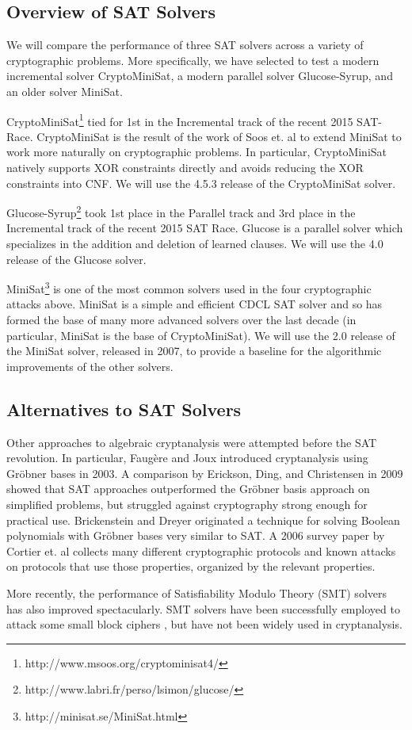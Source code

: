 \subsection{Overview of SAT Solvers}
\label{sec:related:solvers}

We will compare the performance of three SAT solvers across a variety of cryptographic problems. More specifically, we have selected to test a modern incremental solver CryptoMiniSat, a modern parallel solver Glucose-Syrup, and an older solver MiniSat.

CryptoMiniSat\footnote{http://www.msoos.org/cryptominisat4/} tied for 1st in the Incremental track of the recent 2015 SAT-Race. CryptoMiniSat is the result of the work of Soos et. al \cite{SNC09} to extend MiniSat to work more naturally on cryptographic problems.  In particular, CryptoMiniSat natively supports XOR constraints directly and avoids reducing the XOR constraints into CNF. We will use the 4.5.3 release of the CryptoMiniSat solver.

Glucose-Syrup\footnote{http://www.labri.fr/perso/lsimon/glucose/} took 1st place in the Parallel track and 3rd place in the Incremental track of the recent 2015 SAT Race. Glucose is a parallel solver which specializes in the addition and deletion of learned clauses. We will use the 4.0 release of the Glucose solver.

MiniSat\footnote{http://minisat.se/MiniSat.html} is one of the most common solvers used in the four cryptographic attacks above. MiniSat is a simple and efficient CDCL SAT solver and so has formed the base of many more advanced solvers over the last decade (in particular, MiniSat is the base of CryptoMiniSat). We will use the 2.0 release of the MiniSat solver, released in 2007, to provide a baseline for the algorithmic improvements of the other solvers.

\subsection{Alternatives to SAT Solvers}
\label{sec:related:otherattacks}
Other approaches to algebraic cryptanalysis were attempted before the SAT revolution. In particular, Faug\`{e}re and Joux \cite{FJ03} introduced cryptanalysis using Gr\"{o}bner bases in 2003. A comparison by Erickson, Ding, and Christensen \cite{EDC09} in 2009 showed that SAT approaches outperformed the Gr\"{o}bner basis approach on simplified problems, but struggled against cryptography strong enough for practical use. Brickenstein and Dreyer \cite{BD09} originated a technique for solving Boolean polynomials with Gr\"{o}bner bases very similar to SAT. A 2006 survey paper by Cortier et. al \cite{CDL06} collects many different cryptographic protocols and known attacks on protocols that use those properties, organized by the relevant properties.

More recently, the performance of Satisfiability Modulo Theory (SMT) solvers has also improved spectacularly. \cite{BDMOS12} SMT solvers have been successfully employed to attack some small block ciphers \cite{Stanek14}, but have not been widely used in cryptanalysis.
